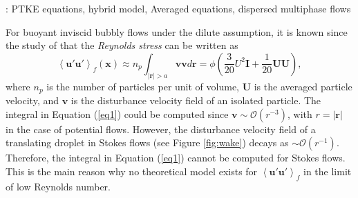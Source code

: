 \documentclass[12pt,a4paper]{article}
\newcommand{\avg}[1]{\left<#1\right>}
\renewcommand{\avg}[1]{\left<#1\right>}
\begin{document}
: PTKE equations, hybrid model, Averaged equations, dispersed multiphase flows



For buoyant inviscid bubbly flows under the dilute assumption, it is known since the study of \cite{van1982bubble} that the \textit{Reynolds stress} can be written as
\begin{equation}
    \avg{\textbf{u}'\textbf{u}'}_f (\textbf{x})
    \approx
    n_p \int_{|\textbf{r}| > a}\textbf{v}\textbf{v}  d\textbf{r}
    = \phi \left(\frac{3}{20} U^2\textbf{I} + \frac{1}{20} \textbf{UU} \right),
    \label{eq1}
\end{equation}
where $n_p$ is the number of particles per unit of volume, $\textbf{U}$ is the averaged particle velocity, and $\textbf{v}$ is the disturbance velocity field of an isolated particle. 
The integral in Equation (\ref{eq1}) could be computed since $\textbf{v} \sim \mathcal{O}(r^{-3})$, with $r =|\textbf{r}|$ in the case of potential flows. 
However, the disturbance velocity field of a translating droplet in Stokes flows (see Figure \ref{fig:wake}) decays as $\sim \mathcal{O}(r^{-1})$. 
Therefore, the integral in Equation (\ref{eq1}) cannot be computed for Stokes flows. 
This is the main reason why no theoretical model exists for $\avg{\textbf{u}'\textbf{u}'}_f$ in the limit of low Reynolds number. 
\end{document}

